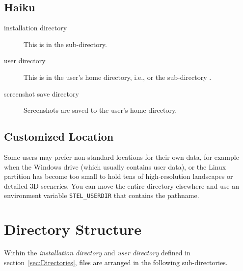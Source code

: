 \subsection{Haiku}
\label{sec:FilesAndDirectories:Haiku}

\begin{description}
\item[installation directory] This is in the
   sub-directory.
\item[user directory] This is in the user's home directory, i.e., 
  or the sub-directory .
\item[screenshot save directory] Screenshots are saved to the user's
  home directory.
\end{description}


\subsection{Customized Location}
\label{sec:FilesAndDirectories:Custom}

Some users may prefer non-standard locations for
their own data, for example when the Windows  drive (which
usually contains user data), or the Linux  partition has
become too small to hold tens of high-resolution landscapes or
detailed 3D sceneries. You can move the entire directory elsewhere and
use an environment variable \texttt{STEL\_USERDIR} that contains the
pathname.

\section{Directory Structure}
\label{sec:FilesAndDirectories:DirectoryStructure}

Within the \emph{installation directory} and \emph{user directory}
defined in section~\ref{sec:Directories}, files are arranged in the
following sub-directories.

